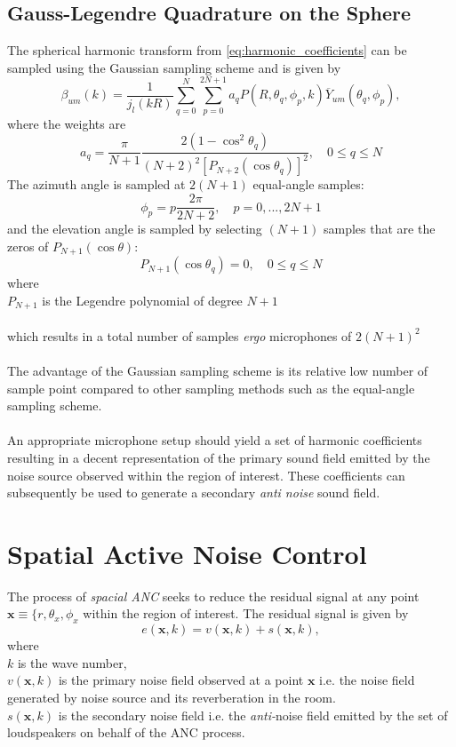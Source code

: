 \subsection{Gauss-Legendre Quadrature on the Sphere}
The spherical harmonic transform from \ref{eq:harmonic_coefficients} can be sampled using the Gaussian sampling scheme and is given by
\begin{equation}
    \beta_{um}(k) = \frac{1}{j_l(kR)} \sum_{q=0}^N\sum_{p=0}^{2N+1}a_qP(R,\theta_q,\phi_p,k)\overline Y_{um}(\theta_q,\phi_p),
\end{equation}
where the weights are
\begin{equation}
    a_q = \frac{\pi}{N+1}\frac{2(1-\cos^2\theta_q)}{(N+2)^2[P_{N+2}(\cos \theta_q)]^2}, \quad 0 \leq q\leq N
\end{equation}
The azimuth angle is sampled at $2(N+1)$ equal-angle samples:
\begin{equation}
    \phi_p = p\frac{2\pi}{2N+2},\quad p=0,...,2N+1
\end{equation}
and the elevation angle is sampled by selecting $(N+1)$ samples that are the zeros of $P_{N+1}(\cos\theta)$:
\begin{equation}
    P_{N+1}(\cos\theta_q)=0, \quad 0 \leq q \leq N
\end{equation}
where\\
$P_{N+1}$ is the Legendre polynomial of degree $N+1$\\\\
which results in a total number of samples \textit{ergo} microphones of $2(N+1)^2$\\\\
The advantage of the Gaussian sampling scheme is its relative low number of sample point compared to other sampling methods such as the equal-angle sampling scheme\cite{Rafaely2015}.\\\\
An appropriate microphone setup should yield a set of harmonic coefficients resulting in a decent representation of the primary sound field emitted by the noise source observed within the region of interest. These coefficients can subsequently be used to generate a secondary \textit{anti noise} sound field.

\section{Spatial Active Noise Control}
The process of \textit{spacial ANC} seeks to reduce the residual signal at any point $\mathbf{x} \equiv \{r,\theta_x, \phi_x$ within the region of interest. The residual signal is given by
\begin{equation}
    e(\mathbf{x},k) = v(\mathbf{x},k) + s(\mathbf{x},k),
\end{equation}
where\\
$k$ is the wave number,\\
$v(\mathbf{x},k)$ is the primary noise field observed at a point $\mathbf{x}$ i.e. the noise field generated by noise source and its reverberation in the room.\\
$s(\mathbf{x},k)$ is the secondary noise field i.e. the \textit{anti-}noise field emitted by the set of loudspeakers on behalf of the ANC process.
